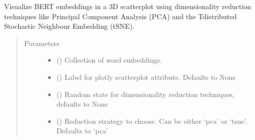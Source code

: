 \documentclass[letterpaper,10pt,english]{sphinxmanual}
\begin{document}
\begin{fulllineitems}
\label{\detokenize{code:code_utils.plotter.display_embeddings_scatterplot_3D}}
Visualize BERT embeddings in a 3D scatterplot using dimensionality
reduction techniques like Principal Component Analysis (PCA) and the T\sphinxhyphen{}distributed
Stochastic Neighbour Embedding (t\sphinxhyphen{}SNE).
\begin{quote}\begin{description}
\item[{Parameters}] \leavevmode\begin{itemize}
\item {} 
 () \textendash{} Collection of word embeddings.

\item {} 
 (\sphinxstyleliteralemphasis{\sphinxupquote{, }}) \textendash{} Label for plotly scatterplot  attribute.
Defaults to None

\item {} 
 (\sphinxstyleliteralemphasis{\sphinxupquote{, }}) \textendash{} Random state for dimensionality reduction techniques,
defaults to None

\item {} 
 (\sphinxstyleliteralemphasis{\sphinxupquote{, }}) \textendash{} Reduction strategy to choose. Can be either
‘pca’ or ‘tsne’. Defaults to ‘pca’


\end{itemize}
\end{description}
\end{quote}
\end{fulllineitems}
\end{document}
